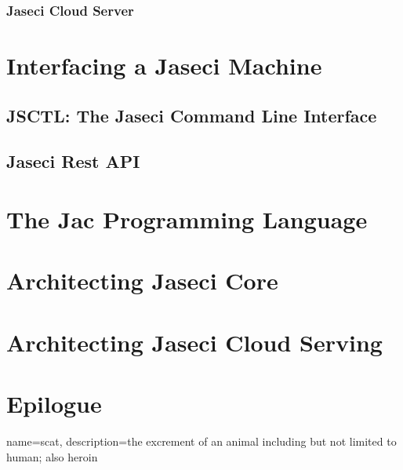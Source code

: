 \documentclass{book}
\begin{document}
\subsection{Jaseci Cloud Server}

\chapter{Interfacing a Jaseci Machine}
\section{JSCTL: The Jaseci Command Line Interface}
\section{Jaseci Rest API}

\chapter{The Jac Programming Language}


\chapter{Architecting Jaseci Core}

\chapter{Architecting Jaseci Cloud Serving}

\chapter*{Epilogue}


{
    name=scat,
    description={the excrement of an animal including but not limited to human; also heroin }
}
\end{document}
